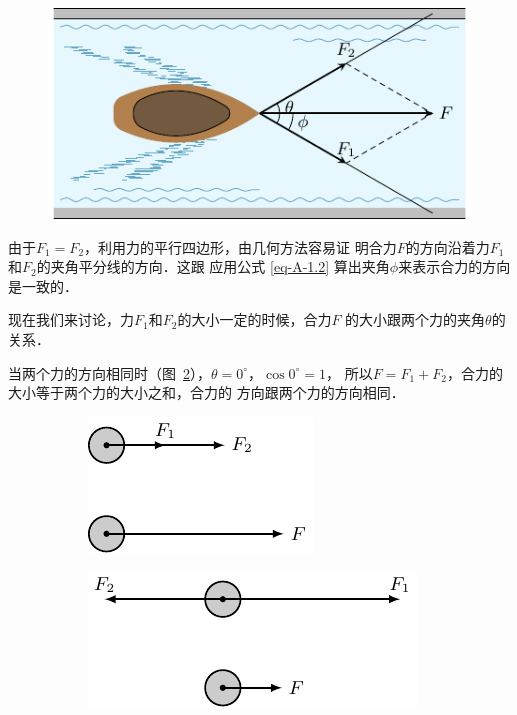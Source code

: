 \begin{figure}[htbp]
    \centering
    \includegraphics{fig/A/1-25.pdf} 
    \caption{} \label{fig_A_1-25} 
\end{figure} 

    由于$F_1=F_2$，利用力的平行四边形，由几何方法容易证
明合力$F$的方向沿着力$F_1$和$F_2$的夹角平分线的方向．这跟
应用公式 \eqref{eq-A-1.2} 算出夹角$\phi$来表示合力的方向是一致的．

    现在我们来讨论，力$F_1$和$F_2$的大小一定的时候，合力$F$
的大小跟两个力的夹角$\theta$的关系．



    当两个力的方向相同时（图~\ref{fig_A_1-26a}），$\theta =0^\circ$，$\cos 0^\circ=1$，
所以$F=F_1+F_2$，合力的大小等于两个力的大小之和，合力的
方向跟两个力的方向相同．

\begin{figure}[htbp]
	\begin{subfigure} {0.46\linewidth} 
		\centering
		\includegraphics{fig/A/1-26a.pdf} 
		\caption{} \label{fig_A_1-26a} 
	\end{subfigure} 
	\hfil
	\begin{subfigure} {0.46\linewidth} 
		\centering
		\includegraphics{fig/A/1-26b.pdf} 
		\caption{} \label{fig_A_1-26b} 
	\end{subfigure} 
	\caption{} \label{fig_A_1-26} 
\end{figure} 

